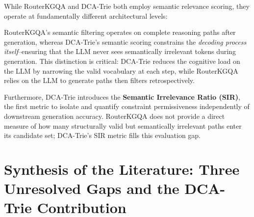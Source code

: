 While RouterKGQA and DCA-Trie both employ semantic relevance scoring, they operate at fundamentally different architectural levels:

\begin{table}[H]
    \centering
    \caption{Architectural comparison of RouterKGQA and DCA-Trie.}
    \label{tab:routerkgqa_comparison}
    \small
\end{table}

RouterKGQA's semantic filtering operates on complete reasoning paths after generation, whereas DCA-Trie's semantic scoring constrains the \emph{decoding process itself}--ensuring that the LLM never sees semantically irrelevant tokens during generation. This distinction is critical: DCA-Trie reduces the cognitive load on the LLM by narrowing the valid vocabulary at each step, while RouterKGQA relies on the LLM to generate paths then filters retrospectively.

Furthermore, DCA-Trie introduces the \textbf{Semantic Irrelevance Ratio (SIR)}, the first metric to isolate and quantify constraint permissiveness independently of downstream generation accuracy. RouterKGQA does not provide a direct measure of how many structurally valid but semantically irrelevant paths enter its candidate set; DCA-Trie's SIR metric fills this evaluation gap.

\section{Synthesis of the Literature: Three Unresolved Gaps and the DCA-Trie Contribution}
\label{sec:synthesis}

